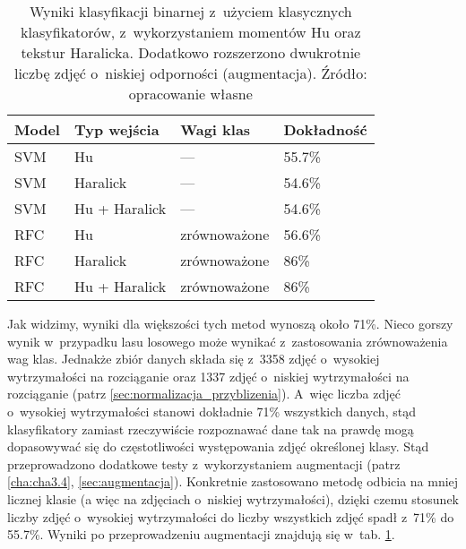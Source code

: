 \begin{table}[h]
	\centering
	\begin{threeparttable}
		\caption{Wyniki klasyfikacji binarnej z~użyciem klasycznych klasyfikatorów, z~wykorzystaniem momentów Hu oraz tekstur Haralicka. Dodatkowo rozszerzono dwukrotnie liczbę zdjęć o~niskiej odporności (augmentacja). Źródło: opracowanie własne}
		\label{hu_haralick_table_with_augmentation}
		\begin{tabularx}{1\textwidth}{ |X|X|X|X| }
		  \hline
		  \textbf{Model} & \textbf{Typ wejścia} & \textbf{Wagi klas} & \textbf{Dokładność}\\

		  \hline
		  SVM & Hu & — & 55.7\%\\

		  \hline
		  SVM & Haralick & — & 54.6\%\\

		  \hline
		  SVM & Hu + Haralick & — & 54.6\%\\

		  \hline
		  RFC & Hu & zrównoważone & 56.6\%\\

		  \hline
  		  RFC & Haralick & zrównoważone & 86\%\\
  		  
		  \hline
  		  RFC & Hu + Haralick & zrównoważone & 86\%\\
  		  
		  \hline
		\end{tabularx}
	\end{threeparttable}
\end{table}
Jak widzimy, wyniki dla większości tych metod wynoszą około 71\%. Nieco gorszy wynik w~przypadku lasu losowego może wynikać z~zastosowania zrównoważenia wag klas. Jednakże zbiór danych składa się z~3358 zdjęć o~wysokiej wytrzymałości na rozciąganie oraz 1337 zdjęć o~niskiej wytrzymałości na rozciąganie (patrz \ref{sec:normalizacja_przyblizenia}). A~więc liczba zdjęć o~wysokiej wytrzymałości stanowi dokładnie 71\% wszystkich danych, stąd klasyfikatory zamiast rzeczywiście rozpoznawać dane tak na prawdę mogą dopasowywać się do częstotliwości występowania zdjęć określonej klasy. Stąd przeprowadzono dodatkowe testy z~wykorzystaniem augmentacji (patrz \ref{cha:cha3.4}, \ref{sec:augmentacja}). Konkretnie zastosowano metodę odbicia na mniej licznej klasie (a więc na zdjęciach o~niskiej wytrzymałości), dzięki czemu stosunek liczby zdjęć o~wysokiej wytrzymałości do liczby wszystkich zdjęć spadł z~71\% do 55.7\%. Wyniki po przeprowadzeniu augmentacji znajdują się w~tab. \ref{hu_haralick_table_with_augmentation}.
